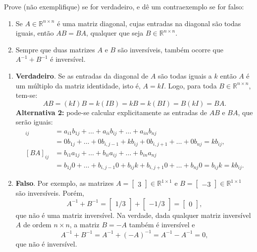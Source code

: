 \documentclass[12pt,a4paper]{article}
\newcommand*\R{\mathbb{R}}
\begin{document}
\begin{ExerciseList}
\Exercise[title={2,5}]
Prove (não exemplifique) se for verdadeiro, e dê um contraexemplo se for falso:
\begin{enumerate}
\item Se $A \in \R^{n \times n}$ é uma matriz diagonal, cujas entradas na diagonal são todas iguais, então $AB = BA$, qualquer que seja $B \in \R^{n \times n}$.
\item Sempre que duas matrizes $A$ e $B$ são inversíveis, também ocorre que $A^{-1} + B^{-1}$ é inversível.
\end{enumerate}
\Answer
\begin{enumerate}
\item \textbf{Verdadeiro}. Se as entradas da diagonal de $A$ são todas iguais a $k$ então $A$ é um múltiplo da matriz identidade, isto é, $A = k I$. Logo, para toda $B \in \R^{n \times n}$, tem-se:
\[
A B = (k I) B = k (I B) = k B = k (B I) = B (k I) = B A.
\]
\textbf{Alternativa 2:} pode-se calcular explicitamente as entradas de $AB$ e $BA$, que serão iguais:
\begin{align*}
[AB]_{ij}
& = a_{i1}b_{1j} + \ldots + a_{ii}b_{ij} + \ldots + a_{in}b_{nj}\\
& = 0 b_{1j} + \ldots + 0 b_{i,j-1} + k b_{ij} + 0b_{i,j+1} + \ldots + 0 b_{nj} = k b_{ij},\\
[BA]_{ij}
& = b_{i1}a_{1j} + \ldots + b_{ii}a_{ij} + \ldots + b_{in}a_{nj}\\
& = b_{1j}0 + \ldots + b_{i,j-1} 0 + b_{ij} k + b_{i,j+1}0 + \ldots + b_{nj}0 = b_{ij} k = k b_{ij}.
\end{align*}

\item \textbf{Falso}. Por exemplo, as matrizes $A = \begin{bmatrix}3\end{bmatrix}\in \R^{1 \times 1}$ e
$B = \begin{bmatrix}-3\end{bmatrix}\in \R^{1 \times 1}$ são inversíveis. Porém,
\[
  A^{-1} + B^{-1}
= \begin{bmatrix}1/3\end{bmatrix}
+ \begin{bmatrix}-1/3\end{bmatrix}
= \begin{bmatrix}0\end{bmatrix},
\]
que não é uma matriz inversível. Na verdade, dada qualquer matriz inversível $A$ de ordem $n \times n$, a matriz $B = -A$ também é inversível e
\[
  A^{-1} + B^{-1}
= A^{-1} + (-A)^{-1}
= A^{-1} - A^{-1}
= 0,
\]
que não é inversível.
\end{enumerate}


\end{ExerciseList}
\end{document}
